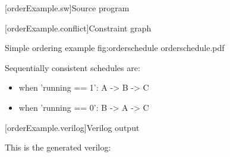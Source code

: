 
\pnum

[orderExample.sw]{Source program}



[orderExample.conflict]{Constraint graph}

\begin{importgraphic}
{Simple ordering example}
{fig:orderschedule}
{orderschedule.pdf}
\end{importgraphic}

Sequentially consistent schedules are:
\begin{itemize}
\item when 'running == 1': A -> B -> C
\item when 'running == 0': B -> A -> C
\end{itemize}

[orderExample.verilog]{Verilog output}

This is the generated verilog:


